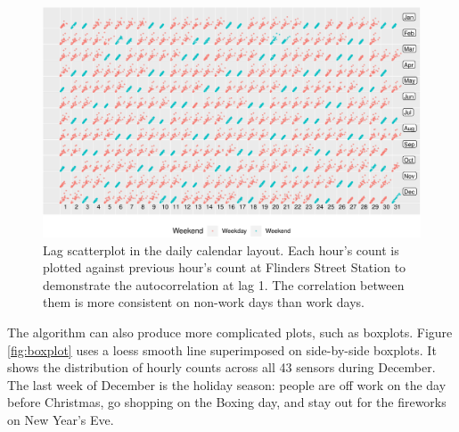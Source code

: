 \documentclass[12pt]{article}
\begin{document}
\begin{figure}

{\centering \includegraphics[width=\textwidth]{figure/scatterplot-1} 

}

\caption{Lag scatterplot in the daily calendar layout. Each hour's count is plotted against previous hour's count at Flinders Street Station to demonstrate the autocorrelation at lag 1. The correlation between them is more consistent on non-work days than work days.}\label{fig:scatterplot}
\end{figure}

The algorithm can also produce more complicated plots, such as boxplots.
Figure \ref{fig:boxplot} uses a loess smooth line superimposed on
side-by-side boxplots. It shows the distribution of hourly counts across
all 43 sensors during December. The last week of December is the holiday
season: people are off work on the day before Christmas, go shopping on
the Boxing day, and stay out for the fireworks on New Year's Eve.
\end{document}
